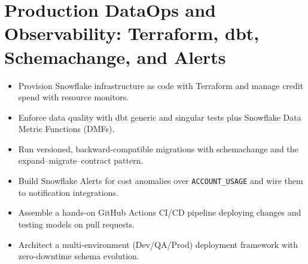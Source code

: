 \chapter{Production DataOps and Observability: Terraform, dbt, Schemachange, and Alerts}
%
\begin{objectives}
\begin{itemize}
    \item Provision Snowflake infrastructure as code with Terraform and manage credit spend with resource monitors.
    \item Enforce data quality with dbt generic and singular tests plus Snowflake Data Metric Functions (DMFs).
    \item Run versioned, backward-compatible migrations with schemachange and the expand--migrate--contract pattern.
    \item Build Snowflake Alerts for cost anomalies over \texttt{ACCOUNT\_USAGE} and wire them to notification integrations.
    \item Assemble a hands-on GitHub Actions CI/CD pipeline deploying changes and testing models on pull requests.
    \item Architect a multi-environment (Dev/QA/Prod) deployment framework with zero-downtime schema evolution.
\end{itemize}
\end{objectives}

